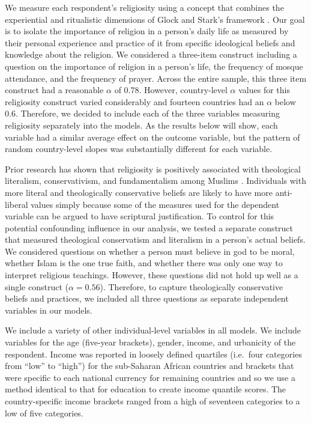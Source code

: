 \documentclass[10pt,letterpaper]{article}
\begin{document}
We measure each respondent's religiosity using a concept that combines the experiential and ritualistic dimensions of Glock and Stark's framework \cite{glock_religion_1965}. Our goal is to isolate the importance of religion in a person's daily life as measured by their personal experience and practice of it from specific ideological beliefs and knowledge about the religion. We considered a three-item construct including a question on the importance of religion in a person's life, the frequency of mosque attendance, and the frequency of prayer. Across the entire sample, this three item construct had a reasonable \(\alpha\) of 0.78. However, country-level \(\alpha\) values for this religiosity construct varied considerably and fourteen countries had an \(\alpha\) below 0.6. Therefore, we decided to include each of the three variables measuring religiosity separately into the models. As the results below will show, each variable had a similar average effect on the outcome variable, but the pattern of random country-level slopes was substantially different for each variable.

Prior research has shown that religiosity is positively associated with theological literalism, conservativism, and fundamentalism among Muslims \cite{moaddel_religious_2018}. Individuals with more literal and theologically conservative beliefs are likely to have more anti-liberal values simply because some of the measures used for the dependent variable can be argued to have scriptural justification. To control for this potential confounding influence in our analysis, we tested a separate construct that measured theological conservatism and literalism in a person's actual beliefs. We considered questions on whether a person must believe in god to be moral, whether Islam is the one true faith, and whether there was only one way to interpret religious teachings. However, these questions did not hold up well as a single construct (\(\alpha=0.56\)). Therefore, to capture theologically conservative beliefs and practices, we included all three questions as separate independent variables in our models.

We include a variety of other individual-level variables in all models. We include variables for the age (five-year brackets), gender, income, and urbanicity of the respondent. Income was reported in loosely defined quartiles (i.e.~four categories from ``low'' to ``high'') for the sub-Saharan African countries and brackets that were specific to each national currency for remaining countries and so we use a method identical to that for education to create income quantile scores. The country-specific income brackets ranged from a high of seventeen categories to a low of five categories.
\end{document}
